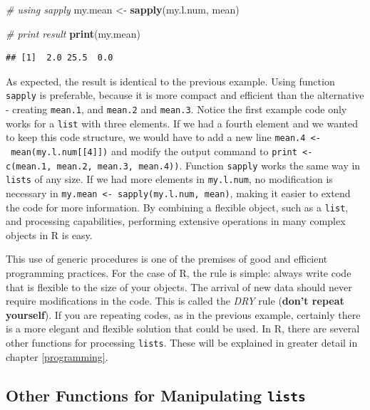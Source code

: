 \documentclass[11pt,]{book}
\newenvironment{Shaded}{\begin{snugshade}}{\end{snugshade}}
\newcommand{\KeywordTok}[1]{\textcolor[rgb]{0.27,0.27,0.27}{\textbf{#1}}}
\newcommand{\StringTok}[1]{\textcolor[rgb]{0.5,0.5,0.5}{#1}}
\newcommand{\CommentTok}[1]{\textcolor[rgb]{0.56,0.35,0.01}{\textit{#1}}}
\newcommand{\NormalTok}[1]{#1}
\begin{document}
\begin{Shaded}
\begin{Highlighting}[]
\CommentTok{# using sapply}
\NormalTok{my.mean <-}\StringTok{ }\KeywordTok{sapply}\NormalTok{(my.l.num, mean)}

\CommentTok{# print result}
\KeywordTok{print}\NormalTok{(my.mean)}
\end{Highlighting}
\end{Shaded}

\begin{verbatim}
## [1]  2.0 25.5  0.0
\end{verbatim}

As expected, the result is identical to the previous example. Using
function \texttt{sapply} is preferable, because it is more compact and
efficient than the alternative - creating \texttt{mean.1}, and
\texttt{mean.2} and \texttt{mean.3}. Notice the first example code only
works for a \texttt{list} with three elements. If we had a fourth
element and we wanted to keep this code structure, we would have to add
a new line \texttt{mean.4\ \textless{}-\ mean(my.l.num{[}{[}4{]}{]})}
and modify the output command to
\texttt{print\ \textless{}-c(mean.1,\ mean.2,\ mean.3,\ mean.4))}.
Function \texttt{sapply} works the same way in \texttt{lists} of any
size. If we had more elements in \texttt{my.l.num}, no modification is
necessary in \texttt{my.mean\ \textless{}-\ sapply(my.l.num,\ mean)},
making it easier to extend the code for more information. By combining a
flexible object, such as a \texttt{list}, and processing capabilities,
performing extensive operations in many complex objects in R is easy.

This use of generic procedures is one of the premises of good and
efficient programming practices. For the case of R, the rule is simple:
always write code that is flexible to the size of your objects. The
arrival of new data should never require modifications in the code. This
is called the \emph{DRY} rule (\textbf{don't repeat yourself}). If you
are repeating codes, as in the previous example, certainly there is a
more elegant and flexible solution that could be used. In R, there are
several other functions for processing \texttt{lists}. These will be
explained in greater detail in chapter \ref{programming}.

\subsection{\texorpdfstring{Other Functions for Manipulating
\texttt{lists}}{Other Functions for Manipulating lists}}\label{other-functions-for-manipulating-lists}
\end{document}
